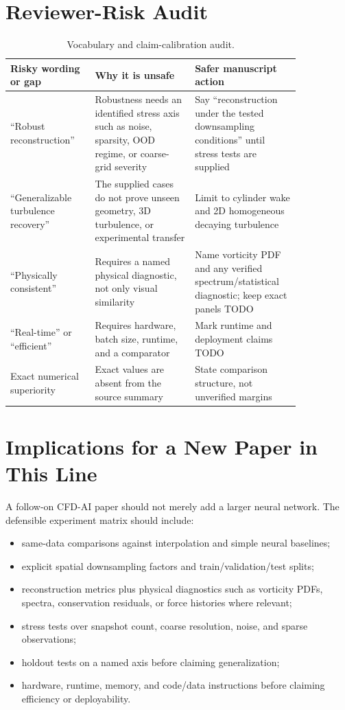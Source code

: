 \documentclass[11pt]{article}
\begin{document}
\section{Reviewer-Risk Audit}
\begin{table}[h]
\centering
\small
\begin{tabular}{p{0.25\linewidth}p{0.30\linewidth}p{0.29\linewidth}}
\toprule
Risky wording or gap & Why it is unsafe & Safer manuscript action \\
\midrule
``Robust reconstruction'' & Robustness needs an identified stress axis such as noise, sparsity, OOD regime, or coarse-grid severity & Say ``reconstruction under the tested downsampling conditions'' until stress tests are supplied \\
``Generalizable turbulence recovery'' & The supplied cases do not prove unseen geometry, 3D turbulence, or experimental transfer & Limit to cylinder wake and 2D homogeneous decaying turbulence \\
``Physically consistent'' & Requires a named physical diagnostic, not only visual similarity & Name vorticity PDF and any verified spectrum/statistical diagnostic; keep exact panels TODO \\
``Real-time'' or ``efficient'' & Requires hardware, batch size, runtime, and a comparator & Mark runtime and deployment claims TODO \\
Exact numerical superiority & Exact values are absent from the source summary & State comparison structure, not unverified margins \\
\bottomrule
\end{tabular}
\caption{Vocabulary and claim-calibration audit.}
\label{tab:risk}
\end{table}

\section{Implications for a New Paper in This Line}
A follow-on CFD-AI paper should not merely add a larger neural network. The defensible experiment matrix should include:
\begin{itemize}
  \item same-data comparisons against interpolation and simple neural baselines;
  \item explicit spatial downsampling factors and train/validation/test splits;
  \item reconstruction metrics plus physical diagnostics such as vorticity PDFs, spectra, conservation residuals, or force histories where relevant;
  \item stress tests over snapshot count, coarse resolution, noise, and sparse observations;
  \item holdout tests on a named axis before claiming generalization;
  \item hardware, runtime, memory, and code/data instructions before claiming efficiency or deployability.
\end{itemize}
\end{document}
